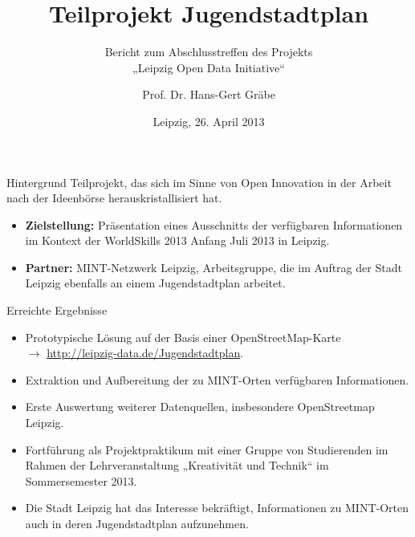 \documentclass{beamer}
\title[Jugendstadtplan]{Teilprojekt Jugendstadtplan}
\subtitle{Bericht zum Abschlusstreffen des Projekts\\ „Leipzig Open Data
  Initiative“}
\author[Gräbe]{Prof. Dr. Hans-Gert Gräbe}
\institute[Uni Leipzig]{Leipzig Open Data Team\\
  \texttt{http://leipzig-data.de}}
\date{Leipzig, 26. April 2013}
\begin{document}
\begin{frame}
\maketitle
\end{frame}
\begin{frame}{Hintergrund}{}
Teilprojekt, das sich im Sinne von Open Innovation in der Arbeit nach der
Ideenbörse herauskristallisiert hat.\bigskip
\begin{itemize} 
\item \textbf{Zielstellung:} Präsentation eines Ausschnitts der verfügbaren
  Informationen im Kontext der WorldSkills 2013 Anfang Juli 2013 in Leipzig. 
\item \textbf{Partner:} MINT-Netzwerk Leipzig, Arbeitsgruppe, die im Auftrag
  der Stadt Leipzig ebenfalls an einem Jugendstadtplan arbeitet. 
\end{itemize}
\end{frame}

\begin{frame}{Erreichte Ergebnisse}{}
\begin{itemize} 
\item Prototypische Lösung auf der Basis einer OpenStreetMap-Karte\\ $\to$
  \url{http://leipzig-data.de/Jugendstadtplan}.
\item Extraktion und Aufbereitung der zu MINT-Orten verfügbaren Informationen.
\item Erste Auswertung weiterer Datenquellen, insbesondere OpenStreetmap
  Leipzig. 
\item Fortführung als Projektpraktikum mit einer Gruppe von Studierenden im
  Rahmen der Lehrveranstaltung „Kreativität und Technik“ im Sommersemester
  2013.
\item Die Stadt Leipzig hat das Interesse bekräftigt, Informationen zu
  MINT-Orten auch in deren Jugendstadtplan aufzunehmen.
\end{itemize}
\end{frame}
\end{document}
